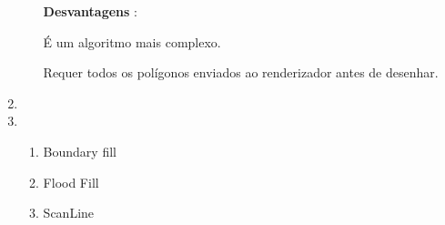 \begin{enumerate}[label=\arabic*)]
\begin{enumerate}[label=\alph*.]
		\textbf{Desvantagens} : 
		
                    É um algoritmo mais complexo.

                    Requer todos os polígonos enviados ao renderizador antes de desenhar.
									
 	\end{enumerate}
 	
 	\item  
 	
 	\item 
 	
 	        \begin{enumerate}[label=\alph*.]
					\setlength\itemsep{1em}
		
					\item Boundary fill 
		
					\item Flood Fill 
		
					\item ScanLine 
									
 			  \end{enumerate}
 			 
   \end{enumerate}

